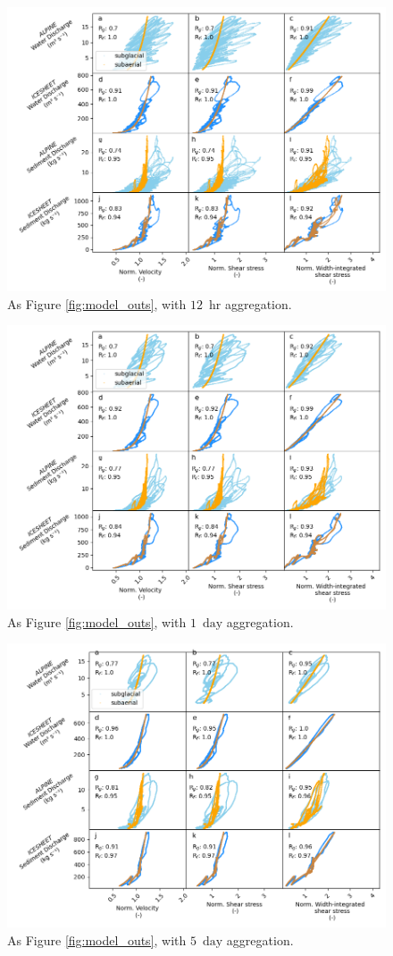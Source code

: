 \documentclass[draft]{agujournal2019}
\newcommand{\unit}[1]{$\mathrm{#1}$}
\begin{document}
\begin{center}
  \begin{figure}[!h]
    \includegraphics[width=0.7\linewidth]{Fig3_12hr.png}
    \caption{As Figure \ref{fig:model_outs}, with $12$ \,\unit{hr} aggregation.}
    \label{fig:model_outs_12hr}
  \end{figure}
\end{center}


\begin{center}
  \begin{figure}[!h]
    \includegraphics[width=0.7\linewidth]{Fig3_1day.png}
    \caption{As Figure \ref{fig:model_outs}, with $1$ \,\unit{day} aggregation.}
    \label{fig:model_outs_1day}
  \end{figure}
\end{center}


\begin{center}
  \begin{figure}[!h]
    \includegraphics[width=0.7\linewidth]{Fig3_5day.png}
    \caption{As Figure \ref{fig:model_outs}, with $5$ \,\unit{day} aggregation.}
    \label{fig:model_outs_5day}
  \end{figure}
\end{center}
\end{document}
